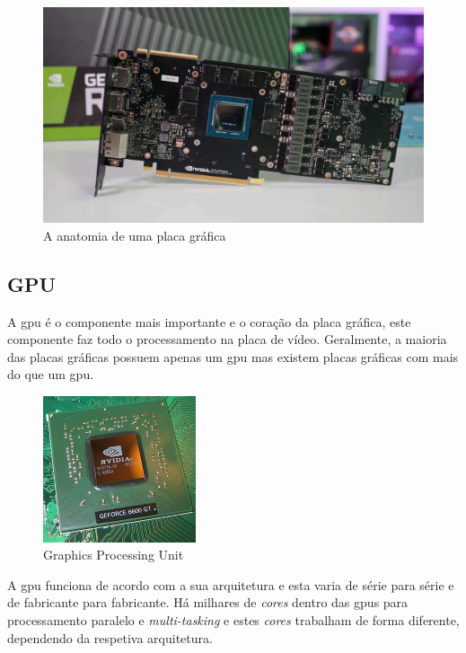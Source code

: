 \documentclass{report}
\begin{document}
\begin{figure}[h]
\centering
\includegraphics[width=1\textwidth]{anatomy.jpg}
\caption{A anatomia de uma placa gráfica}
\label{fig:anatomia}
\end{figure}

\clearpage
\subsection{GPU}
\label{sec.gpu}
A \ac{gpu} é o componente mais importante e o coração da placa gráfica, este componente faz todo o processamento na placa de vídeo. Geralmente, a maioria das placas gráficas possuem apenas um \ac{gpu} mas existem placas gráficas com mais do que um \ac{gpu}.

\begin{figure}[h]
\centering
\includegraphics[width=0.4\textwidth]{gpunit.jpg}
\caption{Graphics Processing Unit}
\label{fig:gpu}
\end{figure}

A \ac{gpu} funciona de acordo com a sua arquitetura e esta varia de série para série e de fabricante para fabricante. Há milhares de \textit{cores} dentro das \acp{gpu} para processamento paralelo e \textit{multi-tasking} e estes \textit{cores} trabalham de forma diferente, dependendo da respetiva arquitetura.
\end{document}
